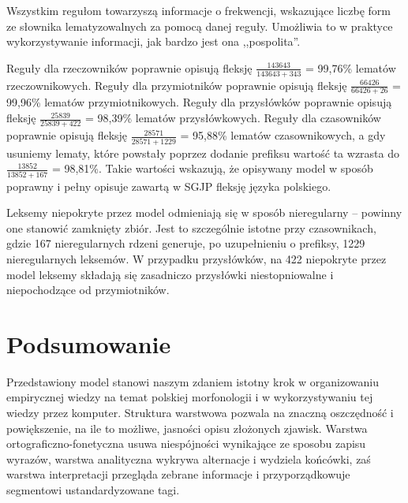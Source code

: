 \documentclass{article}
\begin{document}
Wszystkim regułom towarzyszą informacje o frekwencji, wskazujące liczbę form ze słownika lematyzowalnych za pomocą danej reguły. Umożliwia to w praktyce wykorzystywanie informacji, jak bardzo jest ona ,,pospolita''.


Reguły dla rzeczowników poprawnie opisują fleksję $\frac{143643}{143643+343}$ = 99,76\% lematów rzeczownikowych. %
Reguły dla przymiotników poprawnie opisują fleksję $\frac{66426}{66426+26}$ = 99,96\% lematów przymiotnikowych.
Reguły dla przysłówków poprawnie opisują fleksję $\frac{25839}{25839+422}$ = 98,39\% lematów przysłówkowych. 
Reguły dla czasowników poprawnie opisują fleksję $\frac{28571}{28571+1229}$ = 95,88\% lematów czasownikowych,
a gdy usuniemy lematy, które powstały poprzez dodanie prefiksu wartość ta wzrasta do $\frac{13852}{13852+167}$ = 98,81\%.
Takie wartości wskazują, że opisywany model w sposób poprawny i pełny opisuje zawartą w SGJP fleksję języka polskiego.

Leksemy niepokryte przez model odmieniają się w sposób nieregularny -- powinny one stanowić zamknięty zbiór.
Jest to szczególnie istotne przy czasownikach,
gdzie 167 nieregularnych rdzeni generuje, po uzupełnieniu o prefiksy, 1229 nieregularnych leksemów.
W przypadku przysłówków,
na 422 niepokryte przez model leksemy składają się zasadniczo przysłówki niestopniowalne i niepochodzące od przymiotników.

\section{Podsumowanie}

Przedstawiony model stanowi naszym zdaniem istotny krok
w organizowaniu empirycznej wiedzy na temat polskiej morfonologii
i w wykorzystywaniu tej wiedzy przez komputer.
Struktura warstwowa pozwala na znaczną oszczędność i powiększenie, na ile to możliwe, jasności opisu złożonych zjawisk.
Warstwa ortograficzno-fonetyczna usuwa niespójności wynikające ze sposobu zapisu wyrazów,
warstwa analityczna wykrywa alternacje i wydziela końcówki,
zaś warstwa interpretacji przegląda zebrane informacje i przyporządkowuje segmentowi ustandardyzowane tagi.
\end{document}
